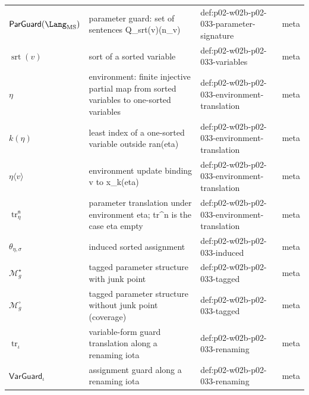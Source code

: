 \begin{longtable}{@{}p{}p{}p{}p{}@{}}
\(\mathsf{ParGuard}(\Lang_{\mathrm{MS}})\) & parameter guard: set of sentences Q\_srt(v)(n\_v) & def:\allowbreak{}p02-\allowbreak{}w02b-\allowbreak{}p02-\allowbreak{}033-\allowbreak{}parameter-\allowbreak{}signature & meta \\
\(\operatorname{srt}(v)\) & sort of a sorted variable & def:\allowbreak{}p02-\allowbreak{}w02b-\allowbreak{}p02-\allowbreak{}033-\allowbreak{}variables & meta \\
\(\eta\) & environment: finite injective partial map from sorted variables to one-sorted variables & def:\allowbreak{}p02-\allowbreak{}w02b-\allowbreak{}p02-\allowbreak{}033-\allowbreak{}environment-\allowbreak{}translation & meta \\
\(k(\eta)\) & least index of a one-sorted variable outside ran(eta) & def:\allowbreak{}p02-\allowbreak{}w02b-\allowbreak{}p02-\allowbreak{}033-\allowbreak{}environment-\allowbreak{}translation & meta \\
\(\eta\langle v\rangle\) & environment update binding v to x\_{k(eta)} & def:\allowbreak{}p02-\allowbreak{}w02b-\allowbreak{}p02-\allowbreak{}033-\allowbreak{}environment-\allowbreak{}translation & meta \\
\(\operatorname{tr}^{\mathsf n}_{\eta}\) & parameter translation under environment eta; tr\^{}n is the case eta empty & def:\allowbreak{}p02-\allowbreak{}w02b-\allowbreak{}p02-\allowbreak{}033-\allowbreak{}environment-\allowbreak{}translation & meta \\
\(\theta_{\eta,\sigma}\) & induced sorted assignment & def:\allowbreak{}p02-\allowbreak{}w02b-\allowbreak{}p02-\allowbreak{}033-\allowbreak{}induced & meta \\
\(\mathcal M^{\star}_{g}\) & tagged parameter structure with junk point & def:\allowbreak{}p02-\allowbreak{}w02b-\allowbreak{}p02-\allowbreak{}033-\allowbreak{}tagged & meta \\
\(\mathcal M^{\circ}_{g}\) & tagged parameter structure without junk point (coverage) & def:\allowbreak{}p02-\allowbreak{}w02b-\allowbreak{}p02-\allowbreak{}033-\allowbreak{}tagged & meta \\
\(\operatorname{tr}_{\iota}\) & variable-form guard translation along a renaming iota & def:\allowbreak{}p02-\allowbreak{}w02b-\allowbreak{}p02-\allowbreak{}033-\allowbreak{}renaming & meta \\
\(\mathsf{VarGuard}_{\iota}\) & assignment guard along a renaming iota & def:\allowbreak{}p02-\allowbreak{}w02b-\allowbreak{}p02-\allowbreak{}033-\allowbreak{}renaming & meta \\

\end{longtable}
